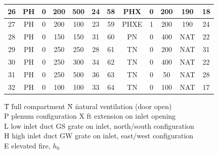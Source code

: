 \begin{table}[p]
\begin{center}
\begin{tabular}{|c|c|c|c|c|c||c|c|c|c|c|c|}
26   & PH      & 0     & 200        & 500       & 24          &   58   & PHX     & 0     & 200        & 190       & 18          \\ \hline              
27   & PH      & 0     & 200        & 100       & 23          &   59   & PHXE    & 1     & 200        & 190       & 24          \\ \hline              
28   & PH      & 0     & 150        & 150       & 31          &   60   & PN      & 0     & 400        & NAT       & 22          \\ \hline              
29   & PH      & 0     & 250        & 250       & 28          &   61   & TN      & 0     & 200        & NAT       & 31          \\ \hline              
30   & PH      & 0     & 250        & 300       & 34          &   62   & TN      & 0     & 400        & NAT       & 22          \\ \hline              
31   & PH      & 0     & 250        & 500       & 36          &   63   & TN      & 0     & 50         & NAT       & 28          \\ \hline              
32   & PH      & 0     & 100        & 100       & 33          &   64   & TN      & 0     & 100        & NAT       & 17          \\ \hline 
\end{tabular}
\end{center} 
\begin{tabbing}
\hspace{0.7in} \= T \hspace{0.2in}  \= full compartment     \hspace{0.8in} \= N \hspace{0.2in} \= natural ventilation (door open) \\
               \> P                 \> plenum configuration                \> X                 ft extension on inlet opening \\
               \> L                 \> low inlet duct                      \> GS               \> grate on inlet, north/south configuration \\
               \> H                 \> high inlet duct                     \> GW               \> grate on inlet, east/west configuration \\
               \> E                 \> elevated fire, $h_0$ 
\end{tabbing}       
\label{LLNL_Matrix}  
\end{table}              


